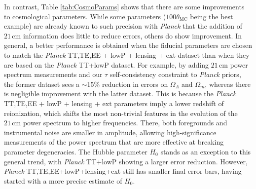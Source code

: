 \documentclass[twocolumn,aps,prd,nofootinbib,showpacs]{revtex4-1}
\begin{document}
In contrast, Table \ref{tab:CosmoParams} shows that there are some improvements to cosmological parameters. While some parameters ($100 \theta_\textrm{MC}$ being the best example) are already known to such precision with \emph{Planck} that the addition of $21\,\textrm{cm}$ information does little to reduce errors, others do show improvement. In general, a better performance is obtained when the fiducial parameters are chosen to match the \emph{Planck} TT,TE,EE + lowP + lensing + ext dataset than when they are based on the \emph{Planck} TT+lowP dataset. For example, by adding $21\,\textrm{cm}$ power spectrum measurements and our $\tau$ self-consistency constraint to \emph{Planck} priors, the former dataset sees a $\sim 15\%$ reduction in errors on $\Omega_\Lambda$ and $\Omega_m$, whereas there is negligible improvement with the latter dataset. This is because the \emph{Planck} TT,TE,EE + lowP + lensing + ext parameters imply a lower redshift of reionization, which shifts the most non-trivial features in the evolution of the $21\,\textrm{cm}$ power spectrum to higher frequencies. There, both foregrounds and instrumental noise are smaller in amplitude, allowing high-significance measurements of the power spectrum that are more effective at breaking parameter degeneracies. The Hubble parameter $H_0$ stands as an exception to this general trend, with \emph{Planck} TT+lowP showing a larger error reduction. However, \emph{Planck} TT,TE,EE+lowP+lensing+ext still has smaller final error bars, having started with a more precise estimate of $H_0$.
\end{document}
